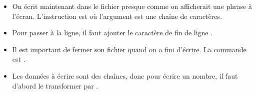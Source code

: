 \documentclass[11pt,class=report,crop=false]{standalone}
\begin{document}
\begin{cours}
\begin{itemize}
  \item On écrit maintenant dans le fichier presque comme on afficherait une phrase à l'écran. L'instruction est  où l'argument est une chaîne de caractères.
  
  \item Pour passer à la ligne, il faut ajouter le caractère de fin de ligne .
  
  \item Il est important de fermer son fichier quand on a fini d'écrire. La commande est . 
   
  \item Les données à écrire sont des chaînes, donc pour écrire un nombre, il faut d'abord le transformer par .
\end{itemize}
  
  
\end{cours}
\end{document}
